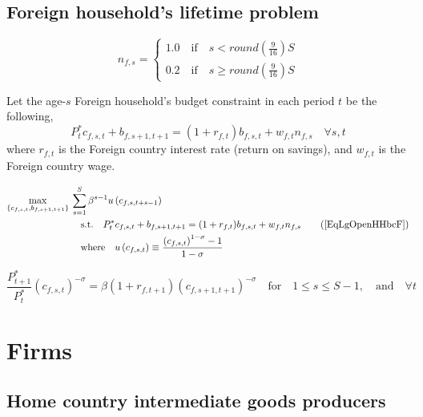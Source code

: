 \documentclass[letterpaper,12pt]{article}
\theoremstyle{definition}
\begin{document}
  \subsection{Foreign household's lifetime problem}\label{SecLgOpenHHlifeF}

    \begin{equation}\label{EqLgOpenHHlabF}
      n_{f,s} =
        \begin{cases}
          1.0 \quad\text{if}\quad s < round\left(\frac{9}{16}\right)S \\
          0.2 \quad\text{if}\quad s \geq round\left(\frac{9}{16}\right)S
        \end{cases}
    \end{equation}

    Let the age-$s$ Foreign household's budget constraint in each period $t$ be the following,
    \begin{equation}\label{EqLgOpenHHbcF}
      P^*_t c_{f,s,t} + b_{f,s+1,t+1} = (1 + r_{f,t})b_{f,s,t} + w_{f,t}n_{f,s} \quad\forall s, t
    \end{equation}
    where $r_{f,t}$ is the Foreign country interest rate (return on savings), and $w_{f,t}$ is the Foreign country wage.

    \begin{align}
      \max_{\{c_{f,s,t},b_{f,s+1,t+1}\}}\: &\sum_{s=1}^S \beta^{s-1}u\left(c_{f,s,t+s-1}\right) \label{EqLgOpenHHmaxprobF} \\
      &\quad\text{s.t.}\quad P^*_t c_{f,s,t} + b_{f,s+1,t+1} = (1 + r_{f,t})b_{f,s,t} + w_{f,t}n_{f,s} \tag{\ref{EqLgOpenHHbcF}} \\
      &\quad\text{where}\quad u\left(c_{f,s,t}\right) \equiv \frac{\left(c_{f,s,t}\right)^{1-\sigma} - 1}{1 - \sigma}
    \end{align}

    \begin{equation}\label{EqLgOpenHHeul_bF}
      \frac{P^*_{t+1}}{P^*_t}\left(c_{f,s,t}\right)^{-\sigma} = \beta(1 + r_{f,t+1})\left(c_{f,s+1,t+1}\right)^{-\sigma} \quad\text{for}\quad 1\leq s\leq S-1,\quad\text{and}\quad\forall t
    \end{equation}


\section{Firms}\label{SecLgOpenFirms}


  \subsection{Home country intermediate goods producers}\label{SecLgOpenFirmIntd_H}
\end{document}
